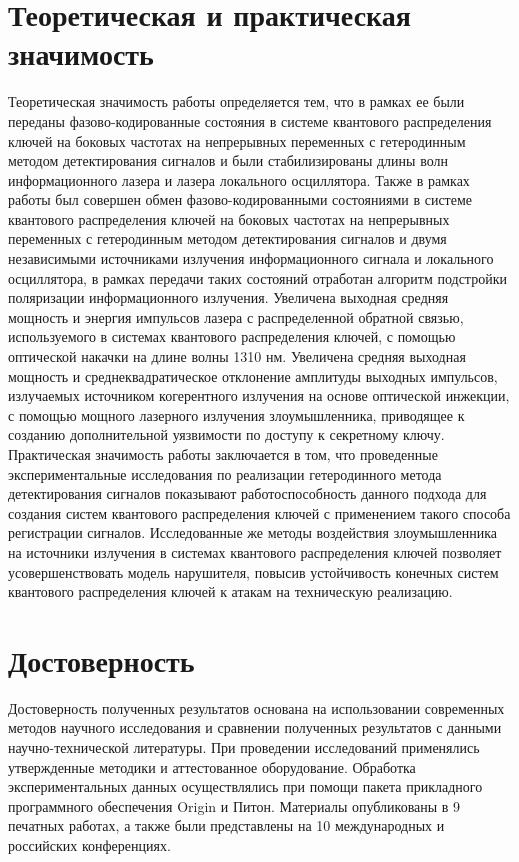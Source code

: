 \section*{Теоретическая и практическая значимость}
Теоретическая значимость работы определяется тем, что в рамках  ее  были переданы фазово-кодированные состояния в системе квантового распределения ключей на боковых частотах на непрерывных переменных с гетеродинным методом детектирования сигналов и были стабилизированы длины волн информационного лазера и лазера локального осциллятора. Также в рамках работы был совершен обмен фазово-кодированными состояниями в системе квантового распределения ключей на боковых частотах на непрерывных переменных с гетеродинным методом детектирования сигналов и двумя независимыми источниками излучения информационного сигнала и локального осциллятора, в рамках передачи таких состояний отработан алгоритм подстройки поляризации информационного излучения. Увеличена выходная средняя мощность и энергия импульсов лазера с распределенной обратной связью, используемого в системах квантового распределения ключей, с помощью оптической накачки на длине волны 1310 нм. Увеличена средняя выходная мощность и среднеквадратическое отклонение амплитуды выходных импульсов, излучаемых источником когерентного излучения на основе оптической инжекции, с помощью мощного лазерного излучения злоумышленника, приводящее к созданию дополнительной уязвимости по доступу к секретному ключу. 
Практическая значимость работы заключается в том, что проведенные экспериментальные исследования по реализации гетеродинного метода детектирования сигналов показывают работоспособность данного подхода для создания систем квантового распределения ключей с применением такого способа регистрации сигналов. Исследованные же методы воздействия злоумышленника на источники излучения в системах квантового распределения ключей позволяет усовершенствовать модель нарушителя, повысив устойчивость конечных систем квантового распределения ключей к атакам на техническую реализацию. 

\section*{Достоверность}
Достоверность полученных результатов основана на использовании современных методов научного исследования и сравнении полученных результатов с данными научно-технической литературы. При проведении исследований применялись утвержденные методики и аттестованное оборудование. Обработка экспериментальных данных осуществлялись при помощи пакета прикладного программного обеспечения Origin и Питон. Материалы опубликованы в 9 печатных работах, а также были представлены на 10 международных и российских конференциях.
